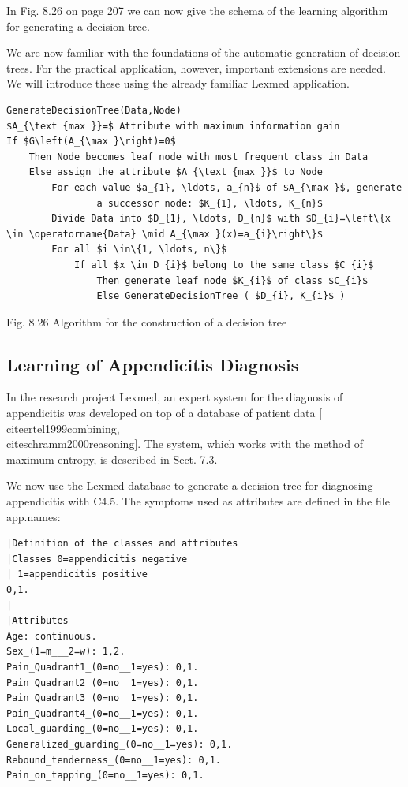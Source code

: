 \documentclass[10pt]{book}
\begin{document}
In Fig. 8.26 on page 207 we can now give the schema of the learning algorithm for generating a decision tree.

We are now familiar with the foundations of the automatic generation of decision trees. For the practical application, however, important extensions are needed. We will introduce these using the already familiar Lexmed application.

\begin{verbatim}
GenerateDecisionTree(Data,Node)
$A_{\text {max }}=$ Attribute with maximum information gain
If $G\left(A_{\max }\right)=0$
    Then Node becomes leaf node with most frequent class in Data
    Else assign the attribute $A_{\text {max }}$ to Node
        For each value $a_{1}, \ldots, a_{n}$ of $A_{\max }$, generate
                a successor node: $K_{1}, \ldots, K_{n}$
        Divide Data into $D_{1}, \ldots, D_{n}$ with $D_{i}=\left\{x \in \operatorname{Data} \mid A_{\max }(x)=a_{i}\right\}$
        For all $i \in\{1, \ldots, n\}$
            If all $x \in D_{i}$ belong to the same class $C_{i}$
                Then generate leaf node $K_{i}$ of class $C_{i}$
                Else GenerateDecisionTree ( $D_{i}, K_{i}$ )
\end{verbatim}

Fig. 8.26 Algorithm for the construction of a decision tree

\subsection{Learning of Appendicitis Diagnosis}
In the research project Lexmed, an expert system for the diagnosis of appendicitis was developed on top of a database of patient data [\\cite{ertel1999combining}, \\cite{schramm2000reasoning}]. The system, which works with the method of maximum entropy, is described in Sect. 7.3.

We now use the Lexmed database to generate a decision tree for diagnosing appendicitis with C4.5. The symptoms used as attributes are defined in the file app.names:

\begin{verbatim}
|Definition of the classes and attributes
|Classes 0=appendicitis negative
| 1=appendicitis positive
0,1.
|
|Attributes
Age: continuous.
Sex_(1=m___2=w): 1,2.
Pain_Quadrant1_(0=no__1=yes): 0,1.
Pain_Quadrant2_(0=no__1=yes): 0,1.
Pain_Quadrant3_(0=no__1=yes): 0,1.
Pain_Quadrant4_(0=no__1=yes): 0,1.
Local_guarding_(0=no__1=yes): 0,1.
Generalized_guarding_(0=no__1=yes): 0,1.
Rebound_tenderness_(0=no__1=yes): 0,1.
Pain_on_tapping_(0=no__1=yes): 0,1.
\end{verbatim}
\end{document}
